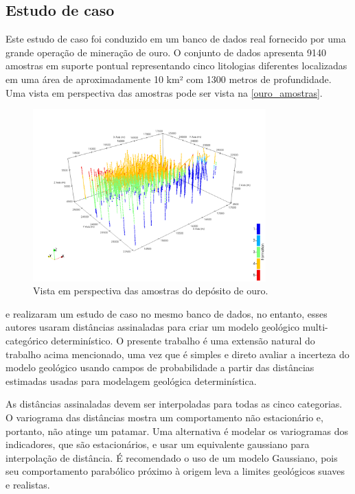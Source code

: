 \subsection{Estudo de caso}

Este estudo de caso foi conduzido em um banco de dados real fornecido por uma grande operação de mineração de ouro. O conjunto de dados apresenta 9140 amostras em suporte pontual representando cinco litologias diferentes localizadas em uma área de aproximadamente 10 km² com 1300 metros de profundidade. Uma vista em perspectiva das amostras pode ser vista na \autoref{ouro_amostras}.

\begin{figure}[H]
	\caption{\label{ouro_amostras} Vista em perspectiva das amostras do depósito de ouro.}
	\centering
		\includegraphics[width=0.8\textwidth]{capitulo_3/imagens/points_perpect.png}
\end{figure}

 e  realizaram um estudo de caso no mesmo banco de dados, no entanto, esses autores usaram distâncias assinaladas para criar um modelo geológico multi-categórico determinístico. O presente trabalho é uma extensão natural do trabalho acima mencionado, uma vez que é simples e direto avaliar a incerteza do modelo geológico usando campos de probabilidade a partir das distâncias estimadas usadas para modelagem geológica determinística.

As distâncias assinaladas devem ser interpoladas para todas as cinco categorias. O variograma das distâncias mostra um comportamento não estacionário e, portanto, não atinge um patamar. Uma alternativa é modelar os variogramas dos indicadores, que são estacionários, e usar um equivalente gaussiano para interpolação de distância. É recomendado o uso de um modelo Gaussiano, pois seu comportamento parabólico próximo à origem leva a limites geológicos suaves e realistas. 

